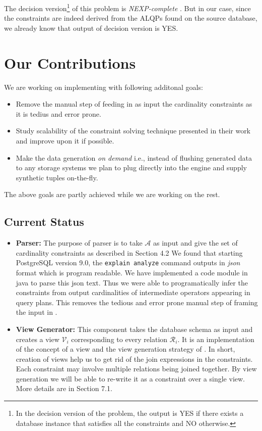 \documentclass[]{article}
\begin{document}
\begin{multicols}{2}
		The decision version\footnote{In the decision version of the problem, the output is YES if there exists a database instance that satisfies all the constraints and NO otherwise.} of this problem is \textit{NEXP-complete} \cite{arasu}.
		But in our case, since the constraints are indeed derived from the ALQPs found on the source database, we already know that output of decision version is YES. 
		
	\section{Our Contributions}
		We are working on implementing \cite{arasu, datasynth} with following additonal goals: 
		\begin{itemize}
			\item Remove the manual step of feeding in as input the cardinality constraints as it is tedius and error prone. 
			\item Study scalability of the constraint solving technique presented in their work and improve upon it if possible. 
			\item Make the data generation \textit{on demand} i.e., instead of flushing generated data to any storage systems we plan to plug directly into the engine and supply synthetic tuples on-the-fly.
		\end{itemize}
		The above goals are partly achieved while we are working on the rest. 
		
		\subsection{Current Status}
		\begin{itemize}
			\item {\bf Parser:}
			The purpose of parser is to take $\mathcal{A}$ as input and give the set of cardinality constraints as described in Section 4.2
			We found that starting PostgreSQL version 9.0, the \texttt{explain analyze} command outputs in \textit{json} format which is program readable.
			We have implemented a code module in java to parse this json text.
			Thus we were able to programatically infer the constraints from output cardinalities of intermediate operators appearing in query plans.
			This removes the tedious and error prone manual step of framing the input in \cite{datasynth}. 

            \item {\bf View Generator:}
            This component takes the database schema as input and creates a view $\mathcal{V}_{i}$ corresponding to every relation $\mathcal{R}_{i}$.
	    It is an implementation of the concept of a view and the view generation strategy of \cite{arasu}. 
            In short, creation of views help us to get rid of the join expressions in the constraints. 
            Each constraint may involve multiple relations being joined together. 
            By view generation we will be able to re-write it as a constraint over a single view.
            More details are in Section 7.1.


\end{itemize}
\end{multicols}
\end{document}
